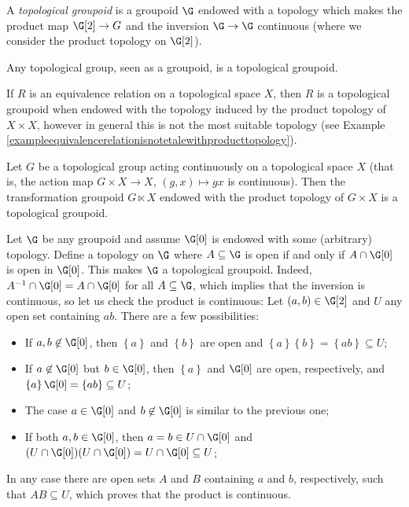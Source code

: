 \begin{definition}
A \emph{topological groupoid} is a groupoid $\G$ endowed with a topology which makes the product map $\G[2]\to G$ and the inversion $\G\to \G$ continuous (where we consider the product topology on $\G[2]$).
\end{definition}

\begin{example}
Any topological group, seen as a groupoid, is a topological groupoid.
\end{example}

\begin{example}
If $R$ is an equivalence relation on a topological space $X$, then $R$ is a topological groupoid when endowed with the topology induced by the product topology of $X\times X$, however in general this is not the most suitable topology (see Example \ref{exampleequivalencerelationisnotetalewithproducttopology}).
\end{example}

\begin{example}
Let $G$ be a topological group acting continuously on a topological space $X$ (that is, the action map $G\times X\to X$, $(g,x)\mapsto gx$ is continuous). Then the transformation groupoid $G\ltimes X$ endowed with the product topology of $G\times X$ is a topological groupoid.
\end{example}

\begin{example}\label{exampleweirdtopologicalgroupoid}
Let $\G$ be any groupoid and assume $\G[0]$ is endowed with some (arbitrary) topology. Define a topology on $\G$ where $A\subseteq \G$ is open if and only if $A\cap\G[0]$ is open in $\G[0]$. This makes $\G$ a topological groupoid. Indeed, $A^{-1}\cap\G[0]=A\cap\G[0]$ for all $A\subseteq\G$, which implies that the inversion is continuous, so let us check the product is continuous: Let $(a,b)\in \G[2]$ and $U$ any open set containing $ab$. There are a few possibilities:
\begin{itemize}
\item If $a,b\not\in\G[0]$, then $\left\{a\right\}$ and $\left\{b\right\}$ are open and $\left\{a\right\}\left\{b\right\}=\left\{ab\right\}\subseteq U$;
\item If $a\not\in \G[0]$ but $b\in\G[0]$, then $\left\{a\right\}$ and $\G[0]$ are open, respectively, and $\left\{a\right\}\G[0]=\left\{ab\right\}\subseteq U$;
\item The case $a\in \G[0]$ and $b\not\in\G[0]$ is similar to the previous one;
\item If both $a,b\in \G[0]$, then $a=b\in U\cap\G[0]$ and $(U\cap\G[0])(U\cap\G[0])=U\cap\G[0]\subseteq U$;
\end{itemize}
In any case there are open sets $A$ and $B$ containing $a$ and $b$, respectively, such that $AB\subseteq U$, which proves that the product is continuous.
\end{example}

